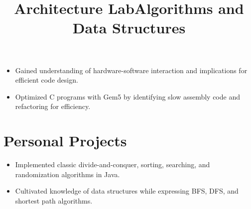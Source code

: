 \documentclass[12pt]{res} %
\begin{document}
\begin{resume}
          \title{\textbf{Architecture Lab}}
          \begin{position}
            \vspace{-14pt}
            \begin{itemize}[leftmargin=-0.4cm, rightmargin=0.8cm]            %
            \itemsep0em
            \item Gained understanding of hardware-software interaction and implications for efficient code design.
            \item Optimized C programs with Gem5 by identifying slow assembly code and refactoring for efficiency.
            \end{itemize}
          \end{position}
          \vspace{-10pt}

          
        \section{Personal Projects}

        \vspace{2pt}

        \title{\textbf{Algorithms and Data Structures}}
        \begin{position}
            \vspace{-14pt}
            \begin{itemize}[leftmargin=-0.4cm, rightmargin=0.8cm]
            \itemsep0em
            \item Implemented classic divide-and-conquer, sorting, searching, and randomization algorithms in Java.
            \item Cultivated knowledge of data structures while expressing BFS, DFS, and shortest path algorithms.
            \end{itemize}
        \end{position}
        \vspace{-10pt}


\end{resume}
\end{document}
